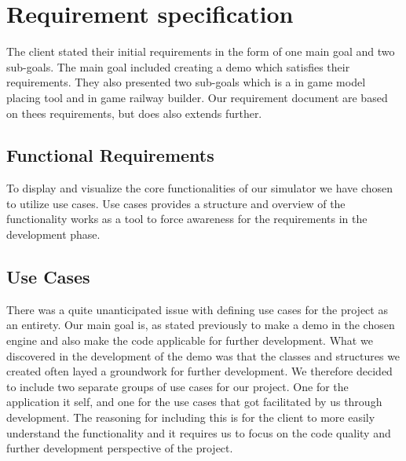 \section{Requirement specification}
The client stated their initial requirements in the form of one main goal and two sub-goals. The main goal included creating a demo which satisfies their requirements. They also presented two sub-goals which is a in game model placing tool and in game railway builder. Our requirement document are based on thees requirements, but does also extends further.


\subsection{Functional Requirements}
To display and visualize the core functionalities of our simulator we have chosen to utilize use cases. Use cases provides a structure and overview of the functionality works as a tool to force awareness for the requirements in the development phase. 


\subsection{Use Cases}
There was a quite unanticipated issue with defining use cases for the project as an entirety. Our main goal is, as stated previously to make a demo in the chosen engine and also make the code applicable for further development. What we discovered in the development of the demo was that the classes and structures we created often layed a groundwork for further development. We therefore decided to include two separate groups of use cases for our project. One for the application it self, and one for the use cases that got facilitated by us through development. The reasoning for including this is for the client to more easily understand the functionality and it requires us to focus on the code quality and further development perspective of the project.

